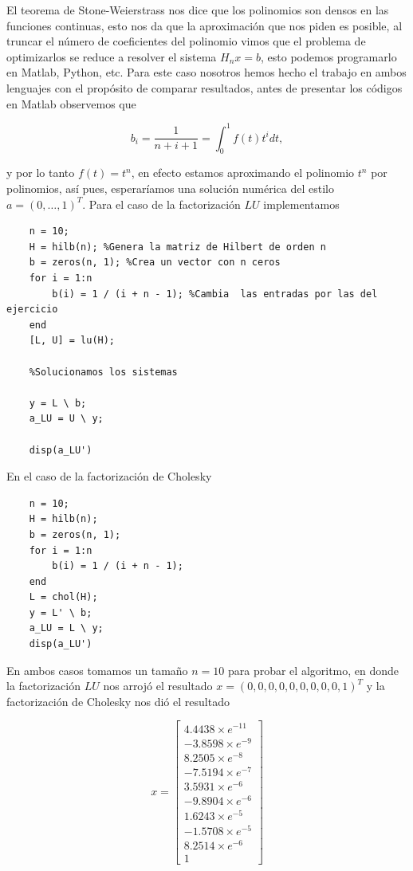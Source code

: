 \begin{enumerate}
    \begin{solution}
    El teorema de Stone-Weierstrass nos dice que los polinomios son densos en las funciones continuas, esto nos da que la aproximación que nos piden es posible, al truncar el número de coeficientes del polinomio vimos que el problema de optimizarlos se reduce a resolver el sistema $H_nx=b$, esto podemos programarlo en Matlab, Python, etc. Para este caso nosotros hemos hecho el trabajo en ambos lenguajes con el propósito de comparar resultados, antes de presentar los códigos en Matlab observemos que

    $$b_i=\dfrac{1}{n+i+1}=\int_0^1f(t)t^i dt,$$

    y por lo tanto $f(t)=t^n$, en efecto estamos aproximando el polinomio $t^n$ por polinomios, así pues, esperaríamos una solución numérica del estilo $a=(0,\ldots,1)^T$. Para el caso de la factorización $LU$ implementamos

    \begin{lstlisting}
    n = 10; 
    H = hilb(n); %Genera la matriz de Hilbert de orden n
    b = zeros(n, 1); %Crea un vector con n ceros 
    for i = 1:n
        b(i) = 1 / (i + n - 1); %Cambia  las entradas por las del ejercicio
    end
    [L, U] = lu(H);

    %Solucionamos los sistemas

    y = L \ b;
    a_LU = U \ y;

    disp(a_LU')
    \end{lstlisting}

    En el caso de la factorización de Cholesky

    \begin{lstlisting}
    n = 10; 
    H = hilb(n); 
    b = zeros(n, 1); 
    for i = 1:n
        b(i) = 1 / (i + n - 1); 
    end
    L = chol(H); 
    y = L' \ b;
    a_LU = L \ y;
    disp(a_LU')
    \end{lstlisting}

    En ambos casos tomamos un tamaño $n=10$ para probar el algoritmo, en donde la factorización $LU$ nos arrojó el resultado $x=(0,0,0,0,0,0,0,0,0,1)^T$ y la factorización de Cholesky nos dió el resultado 

   \[x=
\begin{bmatrix}
4.4438 \times e^{-11} \\
-3.8598 \times e^{-9} \\
8.2505 \times e^{-8} \\
-7.5194 \times e^{-7} \\
3.5931 \times e^{-6} \\
-9.8904 \times e^{-6} \\
1.6243 \times e^{-5} \\
-1.5708 \times e^{-5} \\
8.2514 \times e^{-6} \\
1
\end{bmatrix}
\]
    \end{solution}


\end{enumerate}
